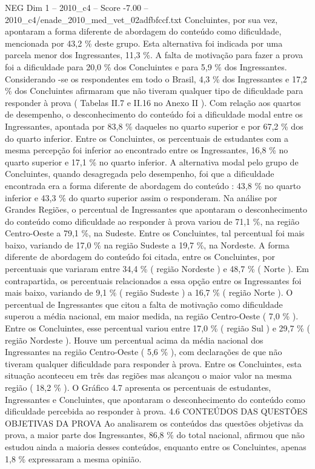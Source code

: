 \begin{textsample}{NEG Dim 1 – 2010\_c4 – Score -7.00 – 2010\_c4/enade\_2010\_med\_vet\_02adfbfccf.txt}
Concluintes, por sua vez, apontaram a forma diferente de abordagem do conteúdo como dificuldade, mencionada por 43,2 \% deste grupo.
Esta alternativa foi indicada por uma parcela menor dos Ingressantes, 11,3 \%.
A falta de motivação para fazer a prova foi a dificuldade para 20,0 \% dos Concluintes e para 5,9 \% dos Ingressantes.
Considerando -se os respondentes em todo o Brasil, 4,3 \% dos Ingressantes e 17,2 \% dos Concluintes afirmaram que não tiveram qualquer tipo de dificuldade para responder à prova ( Tabelas II.7 e II.16 no Anexo II ).
Com relação aos quartos de desempenho, o desconhecimento do conteúdo foi a dificuldade modal entre os Ingressantes, apontada por 83,8 \% daqueles no quarto superior e por 67,2 \% dos do quarto inferior.
Entre os Concluintes, os percentuais de estudantes com a mesma percepção foi inferior ao encontrado entre os Ingressantes, 16,8 \% no quarto superior e 17,1 \% no quarto inferior.
A alternativa modal pelo grupo de Concluintes, quando desagregada pelo desempenho, foi que a dificuldade encontrada era a forma diferente de abordagem do conteúdo : 43,8 \% no quarto inferior e 43,3 \% do quarto superior assim o responderam.
Na análise por Grandes Regiões, o percentual de Ingressantes que apontaram o desconhecimento do conteúdo como dificuldade ao responder à prova variou de 71,1 \%, na região Centro-Oeste a 79,1 \%, na Sudeste.
Entre os Concluintes, tal percentual foi mais baixo, variando de 17,0 \% na região Sudeste a 19,7 \%, na Nordeste.
A forma diferente de abordagem do conteúdo foi citada, entre os Concluintes, por percentuais que variaram entre 34,4 \% ( região Nordeste ) e 48,7 \% ( Norte ).
Em contrapartida, os percentuais relacionados a essa opção entre os Ingressantes foi mais baixo, variando de 9,1 \% ( região Sudeste ) a 16,7 \% ( região Norte ).
O percentual de Ingressantes que citou a falta de motivação como dificuldade superou a média nacional, em maior medida, na região Centro-Oeste ( 7,0 \% ).
Entre os Concluintes, esse percentual variou entre 17,0 \% ( região Sul ) e 29,7 \% ( região Nordeste ).
Houve um percentual acima da média nacional dos Ingressantes na região Centro-Oeste ( 5,6 \% ), com declarações de que não tiveram qualquer dificuldade para responder à prova.
Entre os Concluintes, esta situação aconteceu em três das regiões mas alcançou o maior valor na mesma região ( 18,2 \% ).
O Gráfico 4.7 apresenta os percentuais de estudantes, Ingressantes e Concluintes, que apontaram o desconhecimento do conteúdo como dificuldade percebida ao responder à prova. 4.6 CONTEÚDOS DAS QUESTÕES OBJETIVAS DA PROVA Ao analisarem os conteúdos das questões objetivas da prova, a maior parte dos Ingressantes, 86,8 \% do total nacional, afirmou que não estudou ainda a maioria desses conteúdos, enquanto entre os Concluintes, apenas 1,8 \% expressaram a mesma opinião.

\end{textsample}
